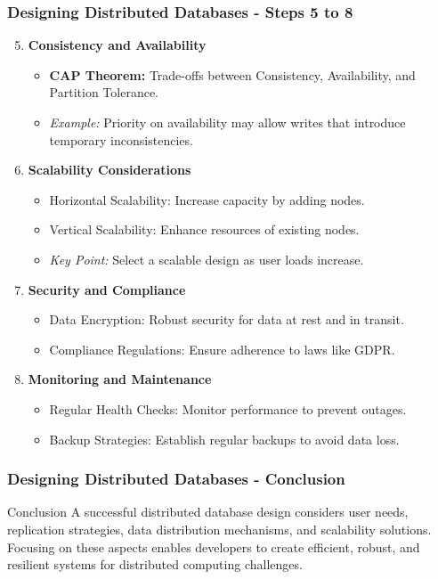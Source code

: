 \documentclass[aspectratio=169]{beamer}
\begin{document}
\begin{frame}[fragile]
  \frametitle{Designing Distributed Databases - Steps 5 to 8}
  \begin{enumerate}
    \setcounter{enumi}{4}
    \item \textbf{Consistency and Availability}
      \begin{itemize}
        \item \textbf{CAP Theorem:} Trade-offs between Consistency, Availability, and Partition Tolerance.
        \item \textit{Example:} Priority on availability may allow writes that introduce temporary inconsistencies.
      \end{itemize}
  
    \item \textbf{Scalability Considerations}
      \begin{itemize}
        \item Horizontal Scalability: Increase capacity by adding nodes.
        \item Vertical Scalability: Enhance resources of existing nodes.
        \item \textit{Key Point:} Select a scalable design as user loads increase.
      \end{itemize}
  
    \item \textbf{Security and Compliance}
      \begin{itemize}
        \item Data Encryption: Robust security for data at rest and in transit.
        \item Compliance Regulations: Ensure adherence to laws like GDPR.
      \end{itemize}
  
    \item \textbf{Monitoring and Maintenance}
      \begin{itemize}
        \item Regular Health Checks: Monitor performance to prevent outages.
        \item Backup Strategies: Establish regular backups to avoid data loss.
      \end{itemize}
  \end{enumerate}
\end{frame}

\begin{frame}[fragile]
  \frametitle{Designing Distributed Databases - Conclusion}
  \begin{block}{Conclusion}
    A successful distributed database design considers user needs, replication strategies, data distribution mechanisms, and scalability solutions. Focusing on these aspects enables developers to create efficient, robust, and resilient systems for distributed computing challenges.
  \end{block}
\end{frame}
\end{document}
